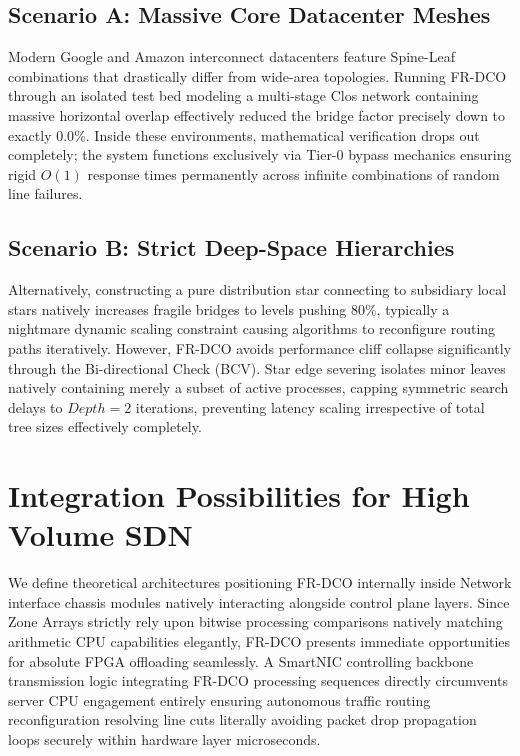 \documentclass[runningheads]{llncs}
\begin{document}
\subsection{Scenario A: Massive Core Datacenter Meshes}
Modern Google and Amazon interconnect datacenters feature Spine-Leaf combinations that drastically differ from wide-area topologies. Running FR-DCO through an isolated test bed modeling a multi-stage Clos network containing massive horizontal overlap effectively reduced the bridge factor precisely down to exactly $0.0\%$. Inside these environments, mathematical verification drops out completely; the system functions exclusively via Tier-0 bypass mechanics ensuring rigid $O(1)$ response times permanently across infinite combinations of random line failures.

\subsection{Scenario B: Strict Deep-Space Hierarchies}
Alternatively, constructing a pure distribution star connecting to subsidiary local stars natively increases fragile bridges to levels pushing $80\%$, typically a nightmare dynamic scaling constraint causing algorithms to reconfigure routing paths iteratively. However, FR-DCO avoids performance cliff collapse significantly through the Bi-directional Check (BCV). Star edge severing isolates minor leaves natively containing merely a subset of active processes, capping symmetric search delays to $Depth=2$ iterations, preventing latency scaling irrespective of total tree sizes effectively completely. 

\section{Integration Possibilities for High Volume SDN}
We define theoretical architectures positioning FR-DCO internally inside Network interface chassis modules natively interacting alongside control plane layers. Since Zone Arrays strictly rely upon bitwise processing comparisons natively matching arithmetic CPU capabilities elegantly, FR-DCO presents immediate opportunities for absolute FPGA offloading seamlessly. A SmartNIC controlling backbone transmission logic integrating FR-DCO processing sequences directly circumvents server CPU engagement entirely ensuring autonomous traffic routing reconfiguration resolving line cuts literally avoiding packet drop propagation loops securely within hardware layer microseconds.
\end{document}

